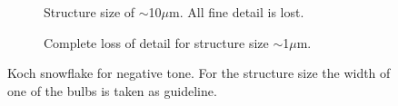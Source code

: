 \begin{figure}[!t]
\begin{subfigure}[t]{0.32\linewidth}
  	\caption{Structure size of $\sim$10$\mu$m. All fine detail is lost.}
  	\label{fig:b2d36_q37}
 \end{subfigure}
 \hfill
     \begin{subfigure}[t]{0.32\linewidth}
  	\centering
  	\caption{Complete loss of detail for structure size $\sim$1$\mu$m.}
  	\label{fig:b2d38_q38}
 \end{subfigure}
\caption{Koch snowflake for negative tone. For the structure size the width of one of the bulbs is taken as guideline.}
  \end{figure}
%
